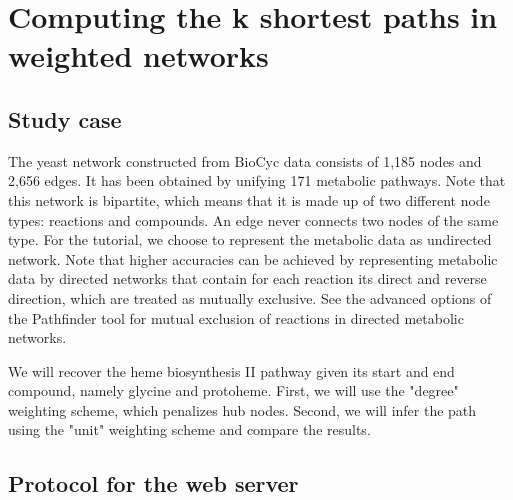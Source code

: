\section{Computing the k shortest paths in weighted networks}

\subsection{Study case}

The yeast network constructed from BioCyc data consists of 1,185 nodes and 2,656 edges.
It has been obtained by unifying 171 metabolic pathways. Note that this network is bipartite, which means that it is made up of
two different node types: reactions and compounds. An edge never connects two nodes of the same type. For the tutorial, we choose
to represent the metabolic data as undirected network. Note that higher accuracies can be achieved by representing metabolic
data by directed networks that contain for each reaction its direct and reverse direction, which are treated as mutually exclusive.
See the advanced options of the Pathfinder tool for mutual exclusion of reactions in directed metabolic networks.

We will recover the heme biosynthesis II pathway given its start and end compound, namely glycine and protoheme. First, we will
use the "degree" weighting scheme, which penalizes hub nodes. Second, we will infer the path using the "unit"
weighting scheme and compare the results.

\subsection{Protocol for the web server}

